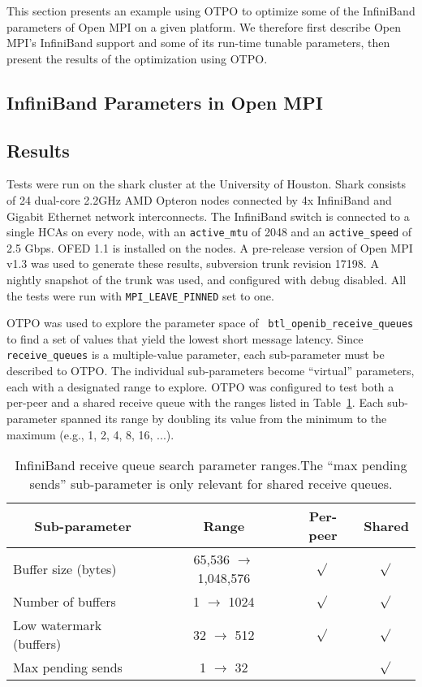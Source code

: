 This section presents an example using OTPO to optimize some of the
InfiniBand parameters of Open MPI on a given platform.  We therefore
first describe Open MPI's InfiniBand support and some of its run-time
tunable parameters, then present the results of the optimization using
OTPO.

\subsection{InfiniBand Parameters in Open MPI}



\subsection{Results}

Tests were run on the shark cluster at the University of Houston.
Shark consists of 24 dual-core 2.2GHz AMD Opteron nodes connected by
4x InfiniBand and Gigabit Ethernet network interconnects.  
The InfiniBand switch is connected to a single HCAs on every node, with an {\tt active\_mtu} of 2048 and an {\tt active\_speed} of 2.5 Gbps. OFED 1.1 is installed on the nodes.  A pre-release version of Open MPI v1.3 was used to generate these results, subversion trunk revision 17198. A nightly snapshot of the trunk was used, and configured with debug disabled. All the tests were run with
{\tt MPI\_LEAVE\_PINNED} set to one.

OTPO was used to explore the parameter space of {\tt
  btl\_\-openib\_\-receive\_\-queues} to find a set of values that
yield the lowest short message latency.  Since {\tt receive\_\-queues}
is a multiple-value parameter, each sub-parameter must be described to
OTPO.  The individual sub-parameters become ``virtual'' parameters,
each with a designated range to explore.  OTPO was configured to test
both a per-peer and a shared receive queue with the ranges listed in
Table~\ref{table:eval-queue-search-params}.  Each sub-parameter
spanned its range by doubling its value from the minimum to the
maximum (e.g., 1, 2, 4, 8, 16, ...).

\def\yes{$\sqrt{}$}

\begin{table}[tb]
\centering
\caption{InfiniBand receive queue search parameter ranges.The ``max
  pending sends'' sub-parameter is only relevant for shared receive
  queues.}
\label{table:eval-queue-search-params} 
\begin{tabular}{|l|c|c|c|} 
\multicolumn{1}{c}{Sub-parameter} &
\multicolumn{1}{c}{Range} &
\multicolumn{1}{c}{Per-peer} &
\multicolumn{1}{c}{Shared} \\
\hline
Buffer size (bytes) & 65,536 $\rightarrow$ 1,048,576 & \yes & \yes \\
Number of buffers & 1 $\rightarrow$ 1024 & \yes & \yes \\
Low watermark (buffers) & 32 $\rightarrow$ 512  & \yes & \yes \\
Max pending sends & 1 $\rightarrow$ 32 & & \yes \\
\hline
\end{tabular}
\end{table}

